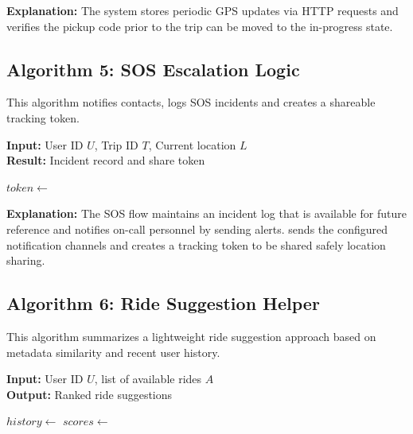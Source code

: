 \textbf{Explanation:} The system stores periodic GPS updates via HTTP requests and verifies the pickup code prior to the trip can be moved to the in-progress state.

\subsection{Algorithm 5: SOS Escalation Logic}

This algorithm notifies contacts, logs SOS incidents and creates a shareable tracking token.

\begin{breakablealgorithm}
\small
\caption{Link Generation Considerations for SOS Incident Handling}
\textbf{Input:} User ID $U$, Trip ID $T$, Current location $L$ \\
\textbf{Result:} Incident record and share token
\begin{algorithmic}[1]
        \State \Return
    \EndIf
    \State {}
    \State $token \gets$ 
    \State {}
    \State {}
    \State {}
    \State {}
\EndFunction
\end{algorithmic}
\end{breakablealgorithm}

\textbf{Explanation:} The SOS flow maintains an incident log that is available for future reference and notifies on-call personnel by sending alerts. sends the configured notification channels and creates a tracking token to be shared safely location sharing.

\subsection{Algorithm 6: Ride Suggestion Helper}

This algorithm summarizes a lightweight ride suggestion approach based on metadata similarity and recent user history.

\begin{breakablealgorithm}
\caption{Ride Suggestion Helper}
\textbf{Input:} User ID $U$, list of available rides $A$ \\
\textbf{Output:} Ranked ride suggestions
\begin{algorithmic}[1]
    \State $history \gets$ 
        \State \Return {}
    \EndIf
    \State $scores \gets$ 
    \State \Return {}
\EndFunction
\end{algorithmic}
\end{breakablealgorithm}

